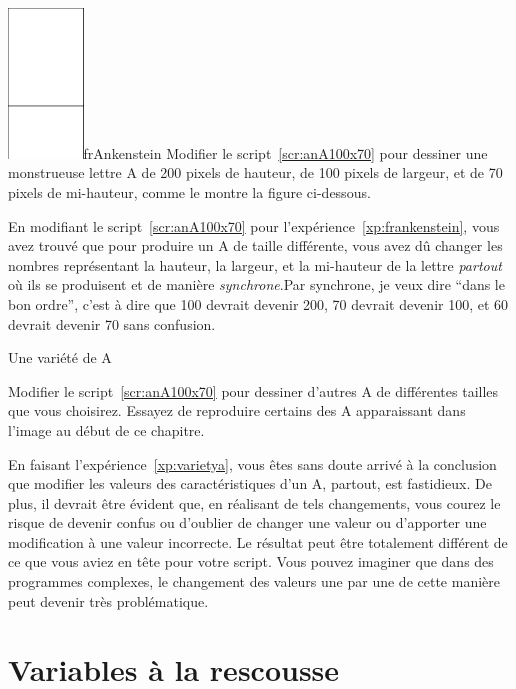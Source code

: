 \documentclass[a4paper,10pt,twoside]{book}
\begin{document}
\begin{exofigwithsizeandtitle}[0.7]{\includegraphics[width=2cm]{varA200}}{frAnkenstein}\label{xp:frankenstein}
Modifier le script~\ref{scr:anA100x70} pour dessiner une monstrueuse lettre A de  200 pixels de hauteur, de 100 pixels de largeur, et de 70 pixels de  mi-hauteur, comme le montre la figure ci-dessous. 
\end{exofigwithsizeandtitle}

En modifiant le script~\ref{scr:anA100x70} pour l'exp\'erience~\ref{xp:frankenstein}, vous avez trouv\'e que pour produire un A de taille diff\'erente, vous avez d\^u changer les nombres repr\'esentant la hauteur, la largeur, et la mi-hauteur de la lettre \emph{partout} o\`u ils se produisent et de mani\`ere  \emph{synchrone}.Par synchrone, je veux dire ``dans le bon ordre'', c'est \`a dire que 100 devrait devenir 200, 70 devrait devenir 100, et 60 devrait devenir 70 sans confusion. 

\begin{exonofigtitle}{Une vari\'et\'e de A}\label{xp:varietya}

Modifier le script~\ref{scr:anA100x70} pour dessiner d'autres A de diff\'erentes tailles que vous choisirez. Essayez de reproduire certains des A apparaissant dans l'image au d\'ebut de ce chapitre. 

\end{exonofigtitle}

En faisant l'exp\'erience~\ref{xp:varietya}, vous \^etes sans doute arriv\'e \`a la conclusion que modifier les valeurs des caract\'eristiques d'un A,  partout, est fastidieux. De plus, il devrait \^etre \'evident que, en r\'ealisant de tels changements, vous courez le risque de devenir confus ou d'oublier de changer une valeur ou d'apporter une modification \`a une valeur incorrecte. Le r\'esultat peut \^etre totalement diff\'erent de ce que vous aviez en t\^ete pour votre script. Vous pouvez imaginer que dans des programmes complexes, le changement des valeurs une par une de cette mani\`ere peut devenir tr\`es probl\'ematique. 

\section{Variables \`a la rescousse}
\end{document}
